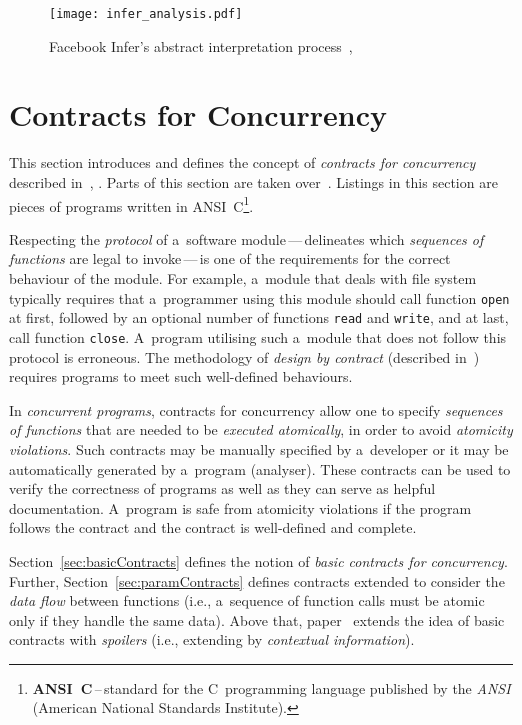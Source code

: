 \begin{figure}[hbt]
    \centering
    \texttt{[image: infer\_analysis.pdf]}
    \caption{%
        Facebook Infer's abstract interpretation
        process~\cite{inferAISlides}, \cite{projectPracticeMarcin2018}
    }
    \label{fig:inferAnalysis}
\end{figure}


\section{Contracts for Concurrency}
\label{sec:contracts}

This section introduces and defines the concept of \emph{contracts for
concurrency} described in~\cite{contracts2015}, \cite{contracts2017}. Parts
of this section are taken over~\cite{excel2019FBInfer}. Listings in this
section are pieces of programs written in ANSI~C\footnote{%
\textbf{ANSI~C}\,--\,standard for the C~programming language published by
the \emph{ANSI} (American National Standards Institute).}.

Respecting the \emph{protocol} of a~software module\,---\,delineates
which \emph{sequences of functions} are legal to invoke\,---\,is one of the
requirements for the correct behaviour of the module. For example, a~module
that deals with file system typically requires that a~programmer using
this module should call function \texttt{open} at first, followed by an
optional number of functions \texttt{read} and \texttt{write}, and at last,
call function \texttt{close}. A~program utilising such a~module that does
not follow this protocol is erroneous. The methodology of \emph{design by
contract} (described in~\cite{contract}) requires programs to meet
such well-defined behaviours.~\cite{contracts2015}

In \emph{concurrent programs}, contracts for concurrency allow one to specify
\emph{sequences of functions} that are needed to be \emph{executed
atomically}, in order to avoid \emph{atomicity violations}. Such contracts
may be manually specified by a~developer or it may be automatically generated
by a~program (analyser). These contracts can be used to verify the correctness
of programs as well as they can serve as helpful documentation. A~program is
safe from atomicity violations if the program follows the contract and
the contract is well-defined and complete.

Section~\ref{sec:basicContracts} defines the notion of \emph{basic contracts
for concurrency}. Further, Section~\ref{sec:paramContracts} defines
contracts extended to consider the \emph{data flow} between functions (i.e.,
a~sequence of function calls must be atomic only if they handle the
same data). Above that, paper~\cite{contracts2017} extends the idea
of basic contracts with \emph{spoilers} (i.e., extending by
\emph{contextual information}).


